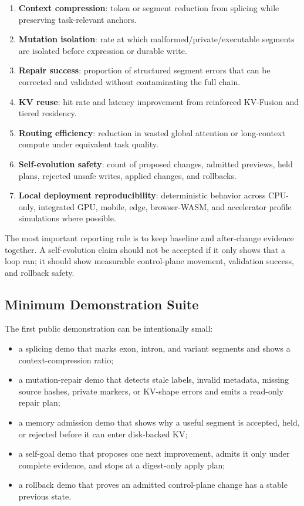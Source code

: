 \documentclass[10pt]{article}
\begin{document}
\begin{enumerate}[leftmargin=*]
  \item \textbf{Context compression}: token or segment reduction from splicing
  while preserving task-relevant anchors.
  \item \textbf{Mutation isolation}: rate at which malformed/private/executable
  segments are isolated before expression or durable write.
  \item \textbf{Repair success}: proportion of structured segment errors that
  can be corrected and validated without contaminating the full chain.
  \item \textbf{KV reuse}: hit rate and latency improvement from reinforced
  KV-Fusion and tiered residency.
  \item \textbf{Routing efficiency}: reduction in wasted global attention or
  long-context compute under equivalent task quality.
  \item \textbf{Self-evolution safety}: count of proposed changes, admitted
  previews, held plans, rejected unsafe writes, applied changes, and rollbacks.
  \item \textbf{Local deployment reproducibility}: deterministic behavior across
  CPU-only, integrated GPU, mobile, edge, browser-WASM, and accelerator profile
  simulations where possible.
\end{enumerate}

The most important reporting rule is to keep baseline and after-change evidence
together. A self-evolution claim should not be accepted if it only shows that a
loop ran; it should show measurable control-plane movement, validation success,
and rollback safety.

\subsection{Minimum Demonstration Suite}

The first public demonstration can be intentionally small:

\begin{itemize}[leftmargin=*]
  \item a splicing demo that marks exon, intron, and variant segments and shows
  a context-compression ratio;
  \item a mutation-repair demo that detects stale labels, invalid metadata,
  missing source hashes, private markers, or KV-shape errors and emits a
  read-only repair plan;
  \item a memory admission demo that shows why a useful segment is accepted,
  held, or rejected before it can enter disk-backed KV;
  \item a self-goal demo that proposes one next improvement, admits it only
  under complete evidence, and stops at a digest-only apply plan;
  \item a rollback demo that proves an admitted control-plane change has a
  stable previous state.
\end{itemize}
\end{document}
